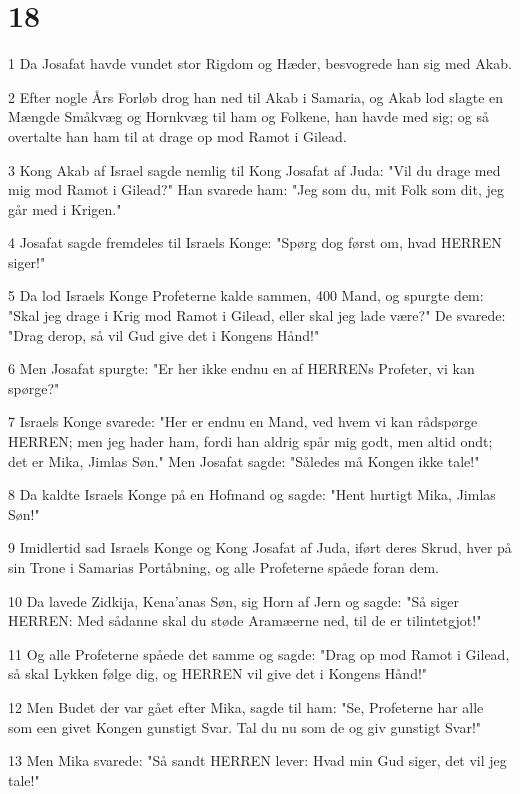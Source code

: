 \chapter{18}

\par 1 Da Josafat havde vundet stor Rigdom og Hæder, besvogrede han sig med Akab.
\par 2 Efter nogle Års Forløb drog han ned til Akab i Samaria, og Akab lod slagte en Mængde Småkvæg og Hornkvæg til ham og Folkene, han havde med sig; og så overtalte han ham til at drage op mod Ramot i Gilead.
\par 3 Kong Akab af Israel sagde nemlig til Kong Josafat af Juda: "Vil du drage med mig mod Ramot i Gilead?" Han svarede ham: "Jeg som du, mit Folk som dit, jeg går med i Krigen."
\par 4 Josafat sagde fremdeles til Israels Konge: "Spørg dog først om, hvad HERREN siger!"
\par 5 Da lod Israels Konge Profeterne kalde sammen, 400 Mand, og spurgte dem: "Skal jeg drage i Krig mod Ramot i Gilead, eller skal jeg lade være?" De svarede: "Drag derop, så vil Gud give det i Kongens Hånd!"
\par 6 Men Josafat spurgte: "Er her ikke endnu en af HERRENs Profeter, vi kan spørge?"
\par 7 Israels Konge svarede: "Her er endnu en Mand, ved hvem vi kan rådspørge HERREN; men jeg hader ham, fordi han aldrig spår mig godt, men altid ondt; det er Mika, Jimlas Søn." Men Josafat sagde: "Således må Kongen ikke tale!"
\par 8 Da kaldte Israels Konge på en Hofmand og sagde: "Hent hurtigt Mika, Jimlas Søn!"
\par 9 Imidlertid sad Israels Konge og Kong Josafat af Juda, iført deres Skrud, hver på sin Trone i Samarias Portåbning, og alle Profeterne spåede foran dem.
\par 10 Da lavede Zidkija, Kena'anas Søn, sig Horn af Jern og sagde: "Så siger HERREN: Med sådanne skal du støde Aramæerne ned, til de er tilintetgjot!"
\par 11 Og alle Profeterne spåede det samme og sagde: "Drag op mod Ramot i Gilead, så skal Lykken følge dig, og HERREN vil give det i Kongens Hånd!"
\par 12 Men Budet der var gået efter Mika, sagde til ham: "Se, Profeterne har alle som een givet Kongen gunstigt Svar. Tal du nu som de og giv gunstigt Svar!"
\par 13 Men Mika svarede: "Så sandt HERREN lever: Hvad min Gud siger, det vil jeg tale!"
